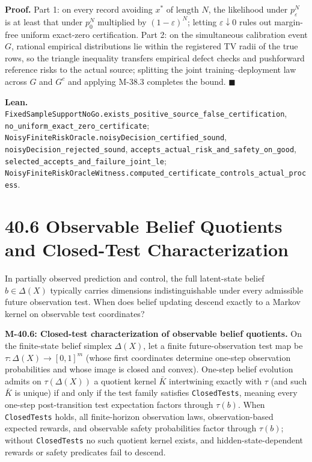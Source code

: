 \documentclass[
  english,
  11pt,
  oneside]{book}
\begin{document}
\textbf{Proof.} Part 1: on every record avoiding \(x^*\) of length \(N\), the likelihood under \(p_\varepsilon^N\) is at least that under \(p_0^N\) multiplied by \((1-\varepsilon)^N\); letting \(\varepsilon\downarrow0\) rules out margin-free uniform exact-zero certification. Part 2: on the simultaneous calibration event \(G\), rational empirical distributions lie within the registered TV radii of the true rows, so the triangle inequality transfers empirical defect checks and pushforward reference risks to the actual source; splitting the joint training--deployment law across \(G\) and \(G^c\) and applying M-38.3 completes the bound. \(\blacksquare\)

\textbf{Lean.} \nolinkurl{FixedSampleSupportNoGo.exists_positive_source_false_certification}, \nolinkurl{no_uniform_exact_zero_certificate}; \nolinkurl{NoisyFiniteRiskOracle.noisyDecision_certified_sound}, \nolinkurl{noisyDecision_rejected_sound}, \nolinkurl{accepts_actual_risk_and_safety_on_good}, \nolinkurl{selected_accepts_and_failure_joint_le}; \nolinkurl{NoisyFiniteRiskOracleWitness.computed_certificate_controls_actual_process}.

\section{40.6 Observable Belief Quotients and Closed-Test Characterization}\label{observable-belief-quotients-and-closed-test-characterization}

In partially observed prediction and control, the full latent-state belief \(b\in\Delta(X)\) typically carries dimensions indistinguishable under every admissible future observation test. When does belief updating descend exactly to a Markov kernel on observable test coordinates?

\hypertarget{m-40-6}{}\label{m-40-6}

\textbf{M-40.6: Closed-test characterization of observable belief quotients.} On the finite-state belief simplex \(\Delta(X)\), let a finite future-observation test map be \(\tau:\Delta(X)\to[0,1]^m\) (whose first coordinates determine one-step observation probabilities and whose image is closed and convex). One-step belief evolution admits on \(\tau(\Delta(X))\) a quotient kernel \(\bar K\) intertwining exactly with \(\tau\) (and such \(\bar K\) is unique) if and only if the test family satisfies \texttt{ClosedTests}, meaning every one-step post-transition test expectation factors through \(\tau(b)\). When \texttt{ClosedTests} holds, all finite-horizon observation laws, observation-based expected rewards, and observable safety probabilities factor through \(\tau(b)\); without \texttt{ClosedTests} no such quotient kernel exists, and hidden-state-dependent rewards or safety predicates fail to descend.
\end{document}
